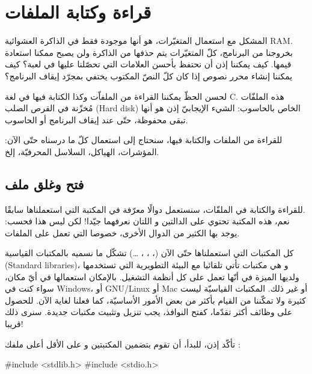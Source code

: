 \chapter{قراءة وكتابة الملفات}

المشكل مع استعمال المتغيّرات، هو أنها موجودة فقط في الذاكرة العشوائية
\textenglish{RAM}.
بخروجنا من البرنامج، كلّ المتغيّرات يتم حذفها من الذاكرة ولن يصبح ممكنا استعادة قيمها. كيف يمكننا إذن أن نحتفظ بأحسن العلامات التي تحصّلنا عليها في لعبة؟ كيف يمكننا إنشاء محرر نصوص إذا كان كلّ النصّ  المكتوب يختفي بمجرّد إيقاف البرنامج؟

لحسن الحظّ يمكننا القراءة من الملفاّت وكذا الكتابة فيها في لغة
\textenglish{C}.
هذه الملفّات مُخزّنة في القرص الصلب
(\textenglish{Hard disk})
الخاص بالحاسوب: الشيء الإيجابيّ إذن هو أنها تبقى محفوظة، حتّى عند إيقاف البرنامج أو الحاسوب.

للقراءة من الملفات والكتابة فيها، سنحتاج إلى استعمال كلّ ما درسناه حتّى الآن: المؤشرات، الهياكل، السلاسل المحرفيّة، إلخ.

\section{فتح وغلق ملف}

للقراءة والكتابة في الملفّات، سنستعمل دوالًا معرّفة في المكتبة
التي استعملناها سابقًا.\\
نعم، هذه المكتبة تحتوي على الدالتين
و
اللتان نعرفهما جيّدا! لكن ليس هذا فحسب: يوجد بها الكثير من الدوال الأخرى، خصوصا التي تعمل على الملفات.

\begin{information}
  كل المكتبات التي استعملناها حتّى الآن
(، ، ، \dots)
تشكّل ما نسميه بالمكتبات القياسية
(\textenglish{Standard libraries})،
و هي مكتبات تأتي تلقائيا مع البيئة التطويرية التي تستخدمها ولديها الميزة في أنّها تعمل على كل أنظمة التشغيل. بالإمكان استعمالها في أيّ مكان، سواء كنت في
\textenglish{Windows}،
أو
\textenglish{GNU/Linux}
أو
\textenglish{Mac}
أو غير ذلك.
المكتبات القياسيّة ليست كثيرة ولا تمكّننا من القيام بأكثر من بعض الأمور الأساسيّة، كما فعلنا لغاية الآن. للحصول على وظائف أكثر تقدّما، كفتح النوافذ، يجب تنزيل وتثبيت مكتبات جديدة. سنرى ذلك قريبا!
\end{information}

تأكّد إذن، للبدأ، أن تقوم بتضمين المكتبتين
و
على الأقل أعلى ملفك
:

\begin{Csource}
#include <stdlib.h>
#include <stdio.h>
\end{Csource}

